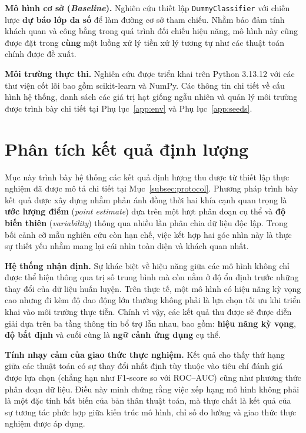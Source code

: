 \documentclass[14pt,a4paper]{extreport}
\begin{document}
\textbf{Mô hình cơ sở (\textit{Baseline}).} Nghiên cứu thiết lập \texttt{DummyClassifier} với chiến lược \textbf{dự báo lớp đa số} để làm đường cơ sở tham chiếu. Nhằm bảo đảm tính khách quan và công bằng trong quá trình đối chiếu hiệu năng, mô hình này cũng được đặt trong \textbf{cùng} một luồng xử lý tiền xử lý tương tự như các thuật toán chính được đề xuất.

\textbf{Môi trường thực thi.} Nghiên cứu được triển khai trên Python 3.13.12 với các thư viện cốt lõi bao gồm scikit-learn và NumPy. Các thông tin chi tiết về cấu hình hệ thống, danh sách các giá trị hạt giống ngẫu nhiên và quản lý môi trường được trình bày chi tiết tại Phụ lục~\ref{app:env} và Phụ lục~\ref{app:seeds}.

\section{Phân tích kết quả định lượng}
\label{subsec:tablesfigures}

Mục này trình bày hệ thống các kết quả định lượng thu được từ thiết lập thực nghiệm đã được mô tả chi tiết tại Mục~\ref{subsec:protocol}. Phương pháp trình bày kết quả được xây dựng nhằm phản ánh đồng thời hai khía cạnh quan trọng là \textbf{ước lượng điểm} (\textit{point estimate}) dựa trên một lượt phân đoạn cụ thể và \textbf{độ biến thiên} (\textit{variability}) thông qua nhiều lần phân chia dữ liệu độc lập. Trong bối cảnh cỡ mẫu nghiên cứu còn hạn chế, việc kết hợp hai góc nhìn này là thực sự thiết yếu nhằm mang lại cái nhìn toàn diện và khách quan nhất.

\textbf{Hệ thống nhận định.} Sự khác biệt về hiệu năng giữa các mô hình không chỉ được thể hiện thông qua trị số trung bình mà còn nằm ở độ ổn định trước những thay đổi của dữ liệu huấn luyện. Trên thực tế, một mô hình có hiệu năng kỳ vọng cao nhưng đi kèm độ dao động lớn thường không phải là lựa chọn tối ưu khi triển khai vào môi trường thực tiễn. Chính vì vậy, các kết quả thu được sẽ được diễn giải dựa trên ba tầng thông tin bổ trợ lẫn nhau, bao gồm: \textbf{hiệu năng kỳ vọng}, \textbf{độ bất định} và cuối cùng là \textbf{ngữ cảnh ứng dụng} cụ thể.

\textbf{Tính nhạy cảm của giao thức thực nghiệm.} Kết quả cho thấy thứ hạng giữa các thuật toán có sự thay đổi nhất định tùy thuộc vào tiêu chí đánh giá được lựa chọn (chẳng hạn như F1-score so với ROC--AUC) cũng như phương thức phân đoạn dữ liệu. Điều này minh chứng rằng việc xếp hạng mô hình không phải là một đặc tính bất biến của bản thân thuật toán, mà thực chất là kết quả của sự tương tác phức hợp giữa kiến trúc mô hình, chỉ số đo lường và giao thức thực nghiệm được áp dụng.
\end{document}
